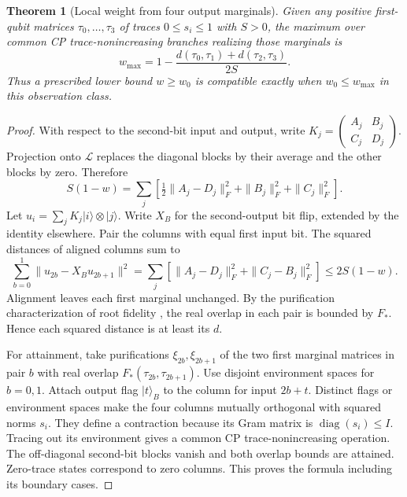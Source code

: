 \documentclass[11pt,letterpaper]{article}
\newtheorem{theorem}{Theorem}[section]\newtheorem{proposition}[theorem]{Proposition}\newtheorem{corollary}[theorem]{Corollary}
\begin{document}
\begin{theorem}[Local weight from four output marginals]\label{thm:four}
Given any positive first-qubit matrices $\tau_0,\ldots,\tau_3$ of traces $0\le s_i\le1$ with $S>0$, the maximum over common CP trace-nonincreasing branches realizing those marginals is
\[
 \boxed{w_{\max}=1-\frac{d(\tau_0,\tau_1)+d(\tau_2,\tau_3)}{2S}.}
\]
Thus a prescribed lower bound $w\ge w_0$ is compatible exactly when $w_0\le w_{\max}$ in this observation class.
\end{theorem}
\begin{proof}
With respect to the second-bit input and output, write $K_j=\left(\begin{smallmatrix}A_j&B_j\\ C_j&D_j\end{smallmatrix}\right)$. Projection onto $\mathcal L$ replaces the diagonal blocks by their average and the other blocks by zero. Therefore
\begin{equation}
 S(1-w)=\sum_j[\tfrac12\|A_j-D_j\|_F^2+\|B_j\|_F^2+\|C_j\|_F^2]. \label{eq:projection}
\end{equation}
Let $u_i=\sum_j K_j|i\rangle\otimes|j\rangle$. Write $X_B$ for the second-output bit flip, extended by the identity elsewhere. Pair the columns with equal first input bit. The squared distances of aligned columns sum to
\[
 \sum_{b=0}^1\|u_{2b}-X_Bu_{2b+1}\|^2
  =\sum_j[\|A_j-D_j\|_F^2+\|C_j-B_j\|_F^2]\le 2S(1-w).
\]
Alignment leaves each first marginal unchanged. By the purification characterization of root fidelity \cite[Ch.~3]{watrous}, the real overlap in each pair is bounded by $F_*$. Hence each squared distance is at least its $d$.

For attainment, take purifications $\xi_{2b},\xi_{2b+1}$ of the two first marginal matrices in pair $b$ with real overlap $F_*(\tau_{2b},\tau_{2b+1})$. Use disjoint environment spaces for $b=0,1$. Attach output flag $|t\rangle_B$ to the column for input $2b+t$. Distinct flags or environment spaces make the four columns mutually orthogonal with squared norms $s_i$. They define a contraction because its Gram matrix is $\operatorname{diag}(s_i)\le I$. Tracing out its environment gives a common CP trace-nonincreasing operation. The off-diagonal second-bit blocks vanish and both overlap bounds are attained. Zero-trace states correspond to zero columns. This proves the formula including its boundary cases.
\end{proof}
\end{document}
